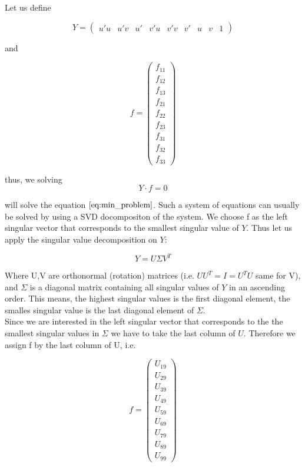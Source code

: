 \documentclass{paper}
\begin{document}
Let us define 

\begin{equation}
Y = 
\left(\begin{array}{ccccccccc}
u' u & u' v & u' & v' u & v' v & v' & u & v & 1
\end{array}
\right)
\end{equation}



and 

\begin{equation}
    f = \left(\begin{array}{c}
f_{11} \\
f_{12} \\
f_{13} \\
f_{21} \\
f_{22} \\
f_{23} \\
f_{31} \\
f_{32} \\
f_{33}
\end{array}
\right)
\end{equation}

thus, we solving 
\begin{equation}
 Y \cdot f = 0
\end{equation}

will solve the equation $\ref{eq:min_problem}$. Such a system of equations can usually be solved by using a SVD docompositon of the system. We choose f as the left singular vector that corresponds to the smallest singular value of $Y$. Thus let us apply the singular value decomposition on $Y$:

\begin{equation}
    Y = U \Sigma V^{T}
\label{eq:svd_y}
\end{equation}

Where U,V are orthonormal (rotation) matrices (i.e. $U U^{T} = I = U^{T} U$ same for V), and $\Sigma$ is a diagonal matrix containing all singular values of $Y$ in an ascending order. This means, the highest singular values is the first diagonal element, the smalles singular value is the last diagonal element of $\Sigma$. \\

Since we are interested in the left singular vector that corresponds to the the smallest singular values in $\Sigma$ we have to take the last column of $U$. Therefore we assign f by the last column of U, i.e. 

\begin{equation}
    f = \left(\begin{array}{c}
U_{19} \\
U_{29} \\
U_{39} \\
U_{49} \\
U_{59} \\
U_{69} \\
U_{79} \\
U_{89} \\
U_{99}
\end{array}
\right)
\end{equation}
 
\end{document}
